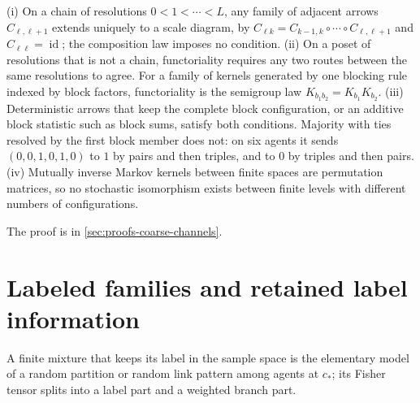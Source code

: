 (i) On a chain of resolutions $0<1<\cdots<L$, any family of adjacent arrows $C_{\ell,\ell+1}$
extends uniquely to a scale diagram, by $C_{\ell k}=C_{k-1,k}\circ\cdots\circ C_{\ell,\ell+1}$ and
$C_{\ell\ell}=\operatorname{id}$; the composition law imposes no condition. (ii) On a poset of
resolutions that is not a chain, functoriality requires any two routes between the same
resolutions to agree. For a family of kernels generated by one blocking rule indexed by block
factors, functoriality is the semigroup law $K_{b_1b_2}=K_{b_1}K_{b_2}$. (iii) Deterministic arrows
that keep the complete block configuration, or an additive block statistic such as block sums,
satisfy both conditions. Majority with ties resolved by the first block member does not: on six
agents it sends $(0,0,1,0,1,0)$ to $1$ by pairs and then triples, and to $0$ by triples and then
pairs. (iv) Mutually inverse Markov kernels between finite spaces are permutation matrices, so no
stochastic isomorphism exists between finite levels with different numbers of configurations.

The proof is in \cref{sec:proofs-coarse-channels}.

\section{Labeled families and retained label information}
\label{sec:rg-thermo-finite-experiment}

A finite mixture that keeps its label in the sample space is the elementary model of a random
partition or random link pattern among agents at $c_*$; its Fisher tensor splits into a label part
and a weighted branch part.

